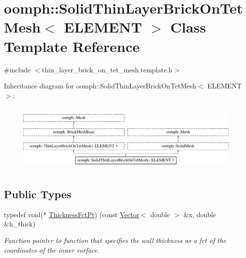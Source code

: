 \hypertarget{classoomph_1_1SolidThinLayerBrickOnTetMesh}{}\section{oomph\+:\+:Solid\+Thin\+Layer\+Brick\+On\+Tet\+Mesh$<$ E\+L\+E\+M\+E\+NT $>$ Class Template Reference}
\label{classoomph_1_1SolidThinLayerBrickOnTetMesh}


{\ttfamily \#include $<$thin\+\_\+layer\+\_\+brick\+\_\+on\+\_\+tet\+\_\+mesh.\+template.\+h$>$}

Inheritance diagram for oomph\+:\+:Solid\+Thin\+Layer\+Brick\+On\+Tet\+Mesh$<$ E\+L\+E\+M\+E\+NT $>$\+:\begin{figure}[H]
\begin{center}
\leavevmode
\includegraphics[height=3.456790cm]{classoomph_1_1SolidThinLayerBrickOnTetMesh}
\end{center}
\end{figure}
\subsection*{Public Types}
\begin{DoxyCompactItemize}
\item 
typedef void($\ast$ \hyperlink{classoomph_1_1SolidThinLayerBrickOnTetMesh_ae4289650b0c0eccb2fd3d661b85e85ee}{Thickness\+Fct\+Pt}) (const \hyperlink{classoomph_1_1Vector}{Vector}$<$ double $>$ \&x, double \&h\+\_\+thick)
\begin{DoxyCompactList}\small\item\em Function pointer to function that specifies the wall thickness as a fct of the coordinates of the inner surface. \end{DoxyCompactList}\end{DoxyCompactItemize}
